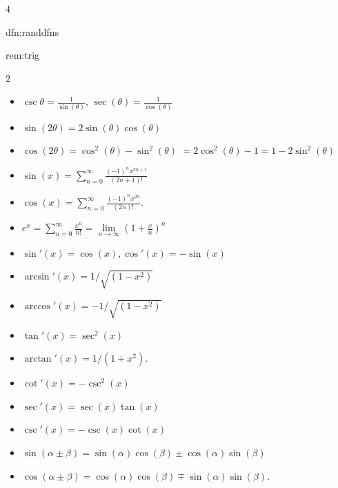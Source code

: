 \documentclass[landscape, 8pt]{extarticle}
\begin{document}
\begin{multicols*}{4}
\begin{dfn}{dfn:randdfns}{ }
		\end{dfn}
		
		
		\begin{rem}{rem:trig}{ }
		\vspace{-4pt}
		\begin{multicols}{2}
			\begin{itemize}
				\item $\csc{\theta} = \frac{1}{\sin(\theta)}$, $\sec(\theta) = \frac{1}{\cos(\theta)}$
				\item $\sin(2\theta) = 2 \sin(\theta)\cos(\theta)$
				\item $\cos(2\theta) = \cos^2(\theta) - \sin^2(\theta)$   $= 2\cos^2(\theta) - 1 = 1 - 2\sin^2(\theta)$
				\item $\sin(x) = \sum_{n=0}^{\infty} \frac{(-1)^nx^{2n+1}}{(2n+1)!}$
				\item $\cos(x) = \sum_{n=0}^{\infty} \frac{(-1)^n x^{2n}}{(2n)!}$.
				\item $e^x = \sum_{n=0}^{\infty} \frac{x^n}{n!} = \lim\limits_{n\to \infty} (1 + \frac{x}{n})^n$
			\end{itemize}
			\columnbreak
			\begin{itemize}
				\item $\sin'(x) = \cos(x), \cos'(x) = -\sin(x)$
				\item $\arcsin'(x) = 1/\sqrt{(1-x^2)}$
				\item $\arccos'(x) = -1/\sqrt{(1-x^2)}$
				\item $\tan'(x) = \sec^2(x)$
				\item $\arctan'(x) = 1/(1+x^2)$.
				\item $\cot'(x) = -\csc^2(x)$
				\item $\sec'(x) = \sec(x)\tan(x)$
				\item $\csc'(x) = -\csc(x)\cot(x)$
				
			\end{itemize}
		\end{multicols}
		\vspace{3pt}
		\begin{itemize}
			\item $\sin(\alpha \pm \beta) = \sin(\alpha)\cos(\beta) \pm \cos(\alpha)\sin(\beta)$
			\item $\cos(\alpha \pm \beta) = \cos(\alpha)\cos(\beta) \mp \sin(\alpha)\sin(\beta)$.
		\end{itemize}
		
		\end{rem}
		

\end{multicols*}
\end{document}
